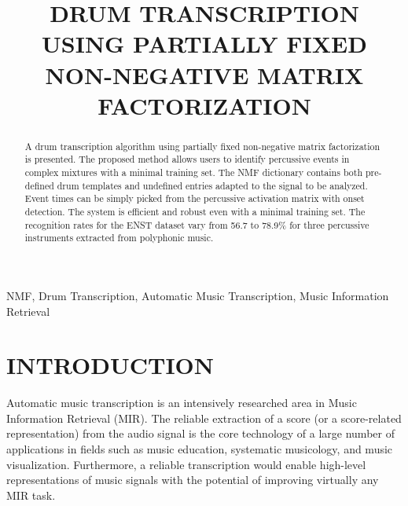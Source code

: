 \documentclass{article}
\title{DRUM TRANSCRIPTION USING PARTIALLY FIXED NON-NEGATIVE MATRIX FACTORIZATION}
\begin{document}
%
\maketitle
%
\begin{abstract}
A drum transcription algorithm using partially fixed non-negative matrix factorization is presented. The proposed method allows users to identify percussive events in complex mixtures with a minimal training set. The NMF dictionary contains both pre-defined drum templates and undefined entries adapted to the signal to be analyzed. Event times can be simply picked from the percussive activation matrix with onset detection. The system is efficient and robust even with a minimal training set. %
The recognition rates for the ENST dataset vary from 56.7 to 78.9\% for three percussive instruments extracted from polyphonic music. 
\end{abstract}
%
\begin{keywords}
NMF, Drum Transcription, Automatic Music Transcription, Music Information Retrieval
\end{keywords}
%
\section{INTRODUCTION}\label{sec:introduction}
Automatic music transcription is an intensively researched area in Music Information Retrieval (MIR). The reliable extraction of a score (or a score-related representation) from the audio signal is the core technology of a large number of applications in fields such as music education, systematic musicology, and music visualization. Furthermore, a reliable transcription would enable high-level representations of music signals with the potential of improving virtually any MIR task.

\end{document}
